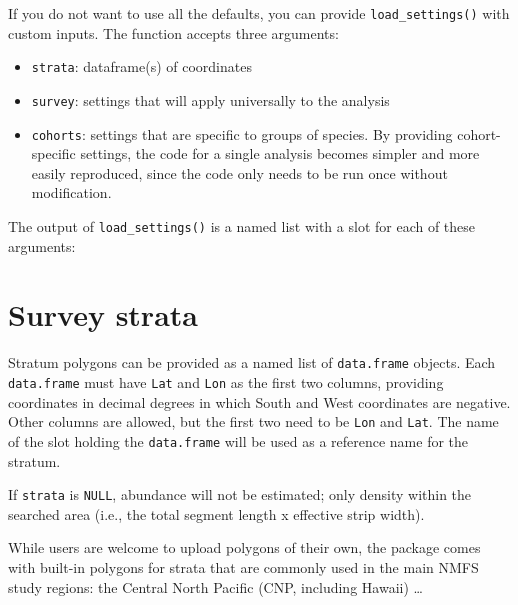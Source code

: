 \documentclass[
]{book}
\newenvironment{Shaded}{\begin{snugshade}}{\end{snugshade}}
\newcommand{\DecValTok}[1]{\textcolor[rgb]{0.00,0.00,0.81}{#1}}
\newcommand{\NormalTok}[1]{#1}
\newcommand{\OperatorTok}[1]{\textcolor[rgb]{0.81,0.36,0.00}{\textbf{#1}}}
\newcommand{\StringTok}[1]{\textcolor[rgb]{0.31,0.60,0.02}{#1}}
\begin{document}
If you do not want to use all the defaults, you can provide \texttt{load\_settings()} with custom inputs. The function accepts three arguments:

\begin{itemize}
\item
  \texttt{strata}: dataframe(s) of coordinates
\item
  \texttt{survey}: settings that will apply universally to the analysis
\item
  \texttt{cohorts}: settings that are specific to groups of species. By providing cohort-specific settings, the code for a single analysis becomes simpler and more easily reproduced, since the code only needs to be run once without modification.
\end{itemize}

The output of \texttt{load\_settings()} is a named list with a slot for each of these arguments:

\begin{Shaded}
\end{Shaded}

\hypertarget{survey-strata}{%
\section*{Survey strata}\label{survey-strata}}

Stratum polygons can be provided as a named list of \texttt{data.frame} objects. Each \texttt{data.frame} must have \texttt{Lat} and \texttt{Lon} as the first two columns, providing coordinates in decimal degrees in which South and West coordinates are negative. Other columns are allowed, but the first two need to be \texttt{Lon} and \texttt{Lat}. The name of the slot holding the \texttt{data.frame} will be used as a reference name for the stratum.

If \texttt{strata} is \texttt{NULL}, abundance will not be estimated; only density within the searched area (i.e., the total segment length x effective strip width).

While users are welcome to upload polygons of their own, the package comes with built-in polygons for strata that are commonly used in the main NMFS study regions: the Central North Pacific (CNP, including Hawaii) \ldots{}
\end{document}
